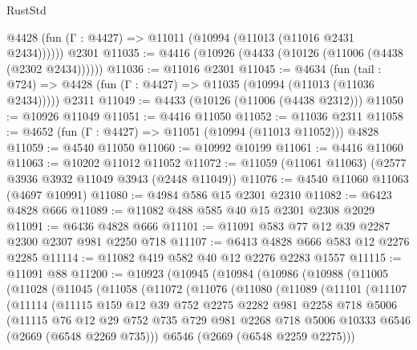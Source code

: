 \begin{lexlean}{RustStd}
\begin{coremodule}
      @4428 (fun (Γ : @4427) => @11011 (@10994 (@11013 (@11016 @2431 @2434))))))
    @2301
@11035 := @4416 (@10926 (@4433 (@10126 (@11006 (@4438 (@2302 @2434))))))
@11036 := @11016 @2301
@11045 := @4634
    (fun (tail : @724) => @4428 (fun (Γ : @4427) => @11035 (@10994 (@11013 (@11036 @2434)))))
    @2311
@11049 := @4433 (@10126 (@11006 (@4438 @2312)))
@11050 := @10926 @11049
@11051 := @4416 @11050
@11052 := @11036 @2311
@11058 := @4652 (fun (Γ : @4427) => @11051 (@10994 (@11013 @11052))) @4828
@11059 := @4540 @11050
@11060 := @10992 @10199
@11061 := @4416 @11060
@11063 := @10202 @11012 @11052
@11072 := @11059 (@11061 @11063) (@2577 @3936 @3932 @11049 @3943 (@2448 @11049))
@11076 := @4540 @11060 @11063 (@4697 @10991)
@11080 := @4984 @586 @15 @2301 @2310
@11082 := @6423 @4828 @666
@11089 := @11082 @488 @585 @40 @15 @2301 @2308 @2029
@11091 := @6436 @4828 @666
@11101 := @11091 @583 @77 @12 @39 @2287 @2300 @2307 @981 @2250 @718
@11107 := @6413 @4828 @666 @583 @12 @2276 @2285
@11114 := @11082 @419 @582 @40 @12 @2276 @2283 @1557
@11115 := @11091 @88
@11200 := @10923
    (@10945
      (@10984
        (@10986
          (@10988
            (@11005
              (@11028
                (@11045
                  (@11058
                    (@11072
                      (@11076
                        (@11080
                          (@11089
                            (@11101
                              (@11107
                                (@11114
                                  (@11115
                                    @159
                                    @12
                                    @39
                                    @752
                                    @2275
                                    @2282
                                    @981
                                    @2258
                                    @718
                                    @5006
                                    (@11115
                                      @76
                                      @12
                                      @29
                                      @752
                                      @735
                                      @729
                                      @981
                                      @2268
                                      @718
                                      @5006
                                      @10333
                                      @6546
                                      (@2669 (@6548 @2269 @735)))
                                    @6546
                                    (@2669 (@6548 @2259 @2275)))

\end{coremodule}
\end{lexlean}

